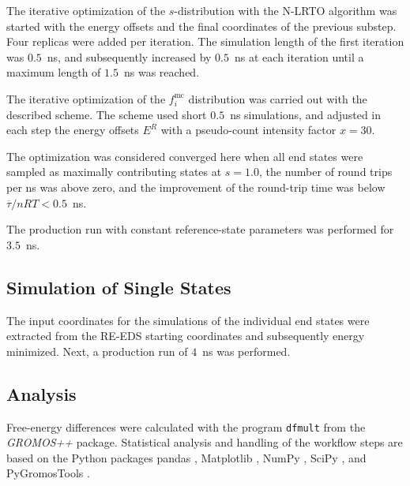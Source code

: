 The iterative optimization of the $s$-distribution with the N-LRTO \cite{Sidler2017} algorithm was started with the energy offsets and the final coordinates of the previous substep.
Four replicas were added per iteration. 
The simulation length of the first iteration was $0.5$~ns, and subsequently increased by $0.5$~ns at each iteration until a maximum length of $1.5$~ns was reached.

The iterative optimization of the $f_i^{\text{mc}}$ distribution was carried out with the described scheme.
The scheme used short $0.5$~ns simulations, and adjusted in each step the energy offsets $E^R$ with a pseudo-count intensity factor $x = 30$.

The optimization was considered converged here when all end states were sampled as maximally contributing states at $s=1.0$, the number of round trips per ns was above zero, and the improvement of the round-trip time was below $\overline{\tau}/nRT < 0.5$~ns.

The production run with constant reference-state parameters was performed for $3.5$~ns.

\subsection{Simulation of Single States}
The input coordinates for the simulations of the individual end states were extracted from the RE-EDS starting coordinates and subsequently energy minimized. Next, a production run of $4$~ns was performed. 

\subsection{Analysis}
Free-energy differences were calculated with the program {\tt{dfmult}} from the \textit{GROMOS++} \cite{eichenberger2011} package.
Statistical analysis and handling of the workflow steps are based on the Python packages pandas \cite{Mckinney2010}, Matplotlib \cite{Hunter2007}, NumPy \cite{VanDerWalt2011}, SciPy \cite{Virtanen2020}, and PyGromosTools \cite{ries2021}.
